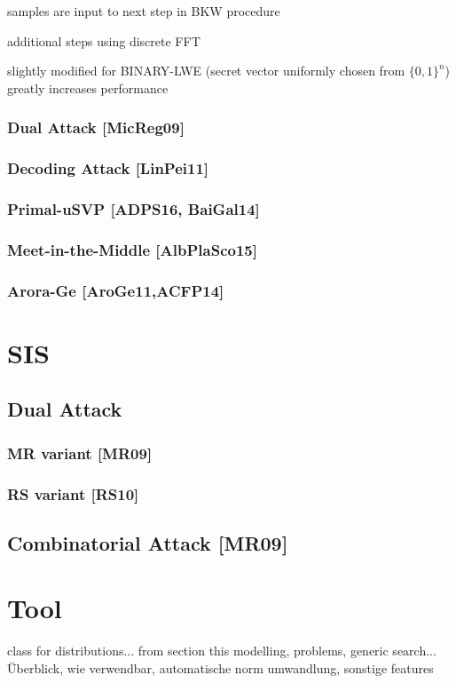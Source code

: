\documentclass[
  a4paper,  %
  twoside,  %
  bibliography=totoc,
  headsepline,
  cleardoublepage=empty,
  parskip=half,
  draft=false
]{scrbook}
\begin{document}
samples are input to next step in BKW procedure

additional steps using discrete FFT

slightly modified for BINARY-LWE (secret vector uniformly chosen from $\{0, 1\}^n$) greatly increases performance


\subsubsection{Dual Attack [MicReg09]}
\subsubsection{Decoding Attack [LinPei11]}
\subsubsection{Primal-uSVP [ADPS16, BaiGal14]}
\subsubsection{Meet-in-the-Middle [AlbPlaSco15]}
\subsubsection{Arora-Ge [AroGe11,ACFP14]}


\section{SIS}
\subsection{Dual Attack}
\subsubsection{MR variant [MR09]}
\subsubsection{RS variant [RS10]}
\subsection{Combinatorial Attack [MR09]}


\section{Tool}
class for distributions... from section this modelling, problems, generic search... Überblick, wie verwendbar,
automatische norm umwandlung,
sonstige features
\end{document}

